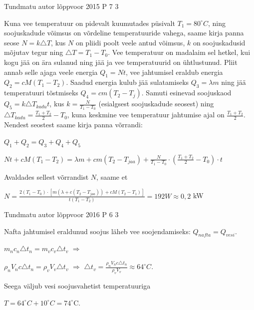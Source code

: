 \documentclass[11pt]{article}
\begin{document}
{%
{Tundmatu autor} %
{lõppvoor} %
{2015} %
{P 7} %
{3} %
{

\ifSolution
Kuna vee temperatuur on pidevalt kuumutades püsivalt $T_1 = 80^{\circ}C$, ning soojuskadude võimsus on võrdeline temperatuuride vahega, saame kirja panna seose $N = k\triangle T$, kus $N$ on pliidi poolt veele antud võimsus, $k$ on soojuskadusid mõjutav tegur ning $\triangle T = T_1 - T_0$. Vee temperatuur on madalaim sel hetkel, kui kogu jää on ära sulanud ning jää ja vee temperatuurid on ühtlustunud. Pliit annab selle ajaga veele energia $Q_1 = Nt$, vee jahtumisel eraldub energia $Q_2 = cM (T_1 - T_2)$. Saadud energia kulub jää sulatamiseks $Q_3 = \lambda m$ ning jää temperatuuri tõstmiseks $Q_4 = cm(T_2 - T_j)$. Samuti esinevad soojuskaod $Q_5 = k\triangle T_{kadu}t$, kus $k = \frac{N}{T_1 - T_0}$ (esialgsest soojuskadude seosest) ning $\triangle T_{kadu} = \frac{T_1 + T_2}{2} - T_0$, kuna keskmine vee temperatuur jahtumise ajal on $\frac{T_1 + T_2}{2}$. Nendest seostest saame kirja panna võrrandi: 
\begin{center}
$Q_1 + Q_2 = Q_3 + Q_4 + Q_5$
\end{center}
\begin{center}
$Nt + cM(T_1 - T_2) = \lambda m + cm(T_2 - T_{jaa}) + \frac{N}{T_1 - T_0} \cdot (\frac{T_1 + T_2}{2} - T_0) \cdot t$
\end{center}
Avaldades sellest võrrandist $N$, saame et
\begin{center}
$N = \frac{2(T_1 - T_0) \cdot [m(\lambda + c(T_2 - T_{jaa})) + cM (T_2 - T_1)]}{t(T_1 - T_2)} = 192W \approx 0,2$ kW
\end{center}
\fi
}

{Tundmatu autor} %
{lõppvoor} %
{2016} %
{P 6} %
{3} %
{

\ifSolution
Nafta jahtumisel eraldunud soojus läheb vee soojendamiseks: $Q_{nafta} = Q_{vesi}$.
\begin{center}
$m_n c_n \triangle t_n = m_v c_v \triangle t_v$ $\Rightarrow$ 
\end{center}
\begin{center}
$\rho_n V_n c \triangle t_n = \rho_v V_v \triangle t_v$ $\Rightarrow$ $\triangle t_v = \frac{\rho_n V_n c \triangle t_n}{\rho_v V_v} \approx 64 ^{\circ}C$.
\end{center}
Seega väljub vesi soojusvahetist temperatuuriga
\begin{center}
$T = 64 ^{\circ}C + 10  ^{\circ}C = 74  ^{\circ}$C.
\end{center}
\fi
}

}
\end{document}
